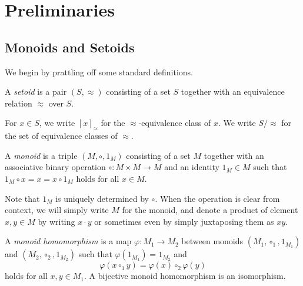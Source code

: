 %

\chapter{Preliminaries}

\section{Monoids and Setoids}

We begin by prattling off some standard definitions.

\begin{definition}%
\label{def:setoid}
\rocqok{}
A \emph{setoid} is a pair $(S, \approx)$ consisting of a set $S$ together with an equivalence relation $\approx$ over
$S$.
\end{definition}
For $x\in S$, we write ${[x]}_\approx$ for the $\approx$-equivalence class of $x$. We write
$S/{\approx}$ for the set
of equivalence classes of $\approx$.

\begin{definition}%
\label{def:monoid}
\rocqok{}
A \emph{monoid} is a triple $(M, \circ, 1_M)$ consisting of a set $M$ together with an associative binary operation
$\circ: M\times M \rightarrow M$ and an identity $1_M \in M$ such that $1_M\circ x = x = x \circ 1_M$ holds for all
$x\in M$.
\end{definition}
Note that $1_M$ is uniquely determined by $\circ$. When the operation is clear from context, we will simply
write $M$ for the monoid, and denote a product of element $x, y\in M$ by writing $x\cdot y$ or sometimes even by simply
juxtaposing them as $xy$.

\begin{definition}%
\label{def:homomorphism}
\rocqok{}
A \emph{monoid homomorphism} is a map $\varphi: M_1\rightarrow M_2$ between monoids $(M_1, \circ_1, 1_{M_1})$ and
$(M_2, \circ_2, 1_{M_2})$ such that $\varphi(1_{M_1}) = 1_{M_2}$ and
\[\varphi(x\circ_1 y) = \varphi(x) \circ_2 \varphi(y)\]
holds for all $x, y\in M_1$. A bijective monoid homomorphism is an isomorphism.
\end{definition}

